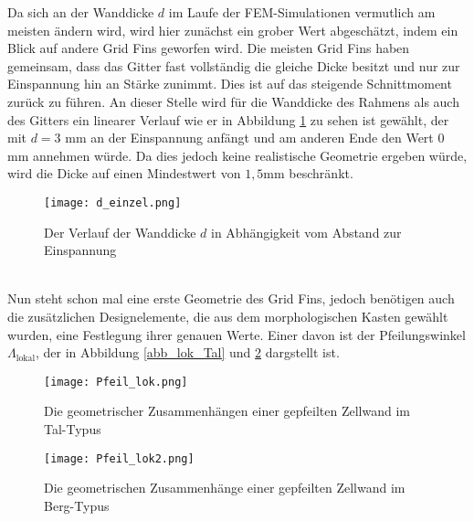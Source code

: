 Da sich an der Wanddicke $d$ im Laufe der FEM-Simulationen vermutlich am meisten ändern wird, wird hier zunächst ein grober Wert abgeschätzt, indem ein Blick auf andere Grid Fins geworfen wird. Die meisten Grid Fins haben gemeinsam, dass das Gitter fast vollständig die gleiche Dicke besitzt und nur zur Einspannung hin an Stärke zunimmt. Dies ist auf das steigende Schnittmoment zurück zu führen. An dieser Stelle wird für die Wanddicke des Rahmens als auch des Gitters ein linearer Verlauf wie er in Abbildung \ref{abb_d_einzel} zu sehen ist gewählt, der mit $d=3$ mm an der Einspannung anfängt und am anderen Ende den Wert $0$ mm annehmen würde. Da dies jedoch keine realistische Geometrie ergeben würde, wird die Dicke auf einen Mindestwert von $1,5$mm beschränkt.
\begin{figure}[h]
	\centering
	\texttt{[image: d\_einzel.png]}
	\caption{Der Verlauf der Wanddicke $d$ in Abhängigkeit vom Abstand zur Einspannung}
	\label{abb_d_einzel}
\end{figure}\\
Nun steht schon mal eine erste Geometrie des Grid Fins, jedoch benötigen auch die zusätzlichen Designelemente, die aus dem morphologischen Kasten gewählt wurden, eine Festlegung ihrer genauen Werte. Einer davon ist der Pfeilungswinkel $\Lambda_\mathrm{lokal}$, der in Abbildung \ref{abb_lok_Tal} und \ref{abb_lok_Berg} dargstellt ist.
\begin{figure}[h]
	\begin{minipage}[t]{0.45\linewidth}
		\centering
		\texttt{[image: Pfeil\_lok.png]}
		\caption{Die geometrischer Zusammenhängen einer gepfeilten Zellwand im Tal-Typus}
		\label{abb_lok_Tal}
	\end{minipage}
	\hfill
	\begin{minipage}[t]{0.45\linewidth}
		\centering
		\texttt{[image: Pfeil\_lok2.png]}
		\caption{Die geometrischen Zusammenhänge einer gepfeilten Zellwand im Berg-Typus}
		\label{abb_lok_Berg}
	\end{minipage}
\end{figure}\\
